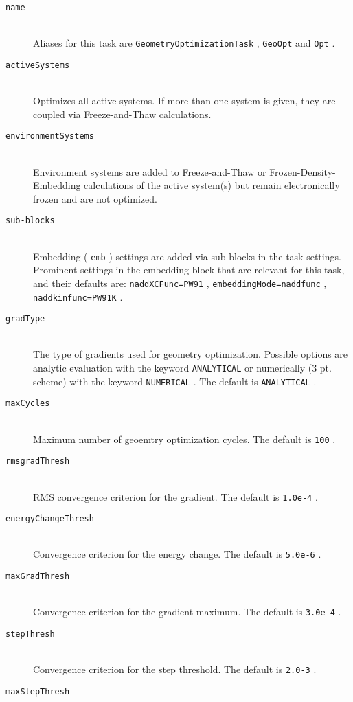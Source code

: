 \documentclass[bibliography=totocnumbered,a4paper,10pt,oneside]{scrbook}
\newcommand{\ttt}[1]{%
  \begingroup\setlength{\fboxsep}{1pt}%
  \colorbox{serenity-green!30}{\texttt{\hspace*{2pt}\vphantom{(g}#1\hspace*{2pt}}}%
  \endgroup
}
\begin{document}
\begin{description}
 \item [\texttt{name}]\hfill \\
   Aliases for this task are \ttt{GeometryOptimizationTask} , \ttt{GeoOpt} and \ttt{Opt}.
 \item [\texttt{activeSystems}]\hfill \\
   Optimizes all active systems. If more than one system is given, they are coupled via Freeze-and-Thaw calculations.
 \item [\texttt{environmentSystems}]\hfill \\
  Environment systems are added to Freeze-and-Thaw or Frozen-Density-Embedding calculations of the active system(s) but remain electronically frozen and are not optimized.
 \item [\texttt{sub-blocks}]\hfill \\
   Embedding (\ttt{emb}) settings are added via sub-blocks in the task settings.
   Prominent settings in the embedding block that are relevant for this task, and their defaults are:
   \ttt{naddXCFunc=PW91}, \ttt{embeddingMode=naddfunc}, \ttt{naddkinfunc=PW91K}.
 \item [\texttt{gradType}]\hfill \\
   The type of gradients used for geometry optimization. Possible options are analytic evaluation with the keyword \ttt{ANALYTICAL} or numerically (3 pt. scheme) with the keyword \ttt{NUMERICAL}. The default is \ttt{ANALYTICAL}.
 \item [\texttt{maxCycles}]\hfill \\
   Maximum number of  geoemtry optimization cycles. The default is \ttt{100}.
 \item [\texttt{rmsgradThresh}]\hfill \\
   RMS convergence criterion for the gradient. The default is \ttt{1.0e-4}. 
 \item [\texttt{energyChangeThresh}]\hfill \\
   Convergence criterion for the energy change. The default is \ttt{5.0e-6}. 
 \item [\texttt{maxGradThresh}]\hfill \\ 
  Convergence criterion for the gradient maximum. The default is \ttt{3.0e-4}. 
 \item [\texttt{stepThresh}]\hfill \\
  Convergence criterion for the step threshold. The default is \ttt{2.0-3}. 
 \item [\texttt{maxStepThresh}]\hfill \\

\end{description}
\end{document}
